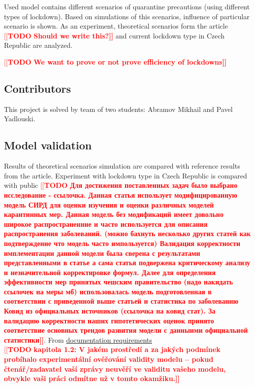 \documentclass[12pt,a4paper]{article}
\newcommand{\todo}[1]{\textcolor{red}{[[\textbf{TODO} \textbf{#1]]}}}
\begin{document}
    Used model contains different scenarios of quarantine precautions (using different types of lockdown).
    Based on simulations of this scenarios, influence of particular scenario is shown. 
    As an experiment, theoretical scenarios form the article \todo{Should we write this?} and current lockdown type in Czech Republic are analyzed.

    \todo{We want to prove or not prove efficiency of lockdowns}
    \subsection{Contributors}    
    This project is solved by team of two students: Abramov Mikhail and Pavel 
    Yadlouski.

    \subsection{Model validation}
    Results of theoretical scenarios simulation are compared with reference results from the article. Experiment with lockdown type in Czech Republic is compared with public 
    \todo{Для достижения поставленных задач было выбрано исследование - ссылочка. Данная статья использует модифицированную модель СИРД для оценки изучения и оценки различных моделей карантинных мер. 
          Данная модель без модификаций имеет довольно широкое распространенние и часто используется для описания распространения заболеваний. (можно бахнуть несколько других статей как подтверждение что модель часто импользуется)
          Валидация корректности имплементации данной модели была сверена с результатами представленными в статье а сама статья подвержена критическому анализу и незначительной корректировке формул.
          Далее для определения эффективности мер принятых чешским правительство (надо накидать ссылочек на меры мб) использовалась модель подготовленная в соответствии с приведенной выше статьей и статистика по заболеванию Ковид из официальных источников (ссылочка на ковид стат).
          За валидацию корректности наших гипотетических оценок принято соответствие основных трендов развития модели с данныими официальной статистики}.
    From  \href{http://perchta.fit.vutbr.cz/vyuka-ims/16}{documentation requirements} \\
    \todo{kapitola 1.2: V jakém prostředí a za jakých podmínek probíhalo experimentální ověřování validity modelu – pokud čtenář/zadavatel vaší zprávy neuvěří ve validitu vašeho modelu, obvykle vaši práci odmítne už v tomto okamžiku.}
    
\end{document}
